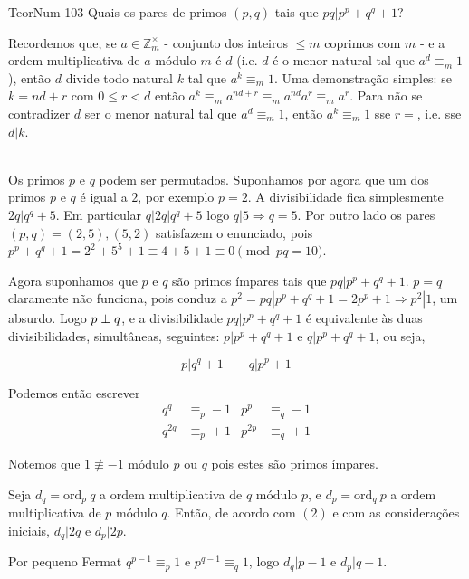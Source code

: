 \documentclass[repertorio-solutions-1.tex]{subfiles}
\renewcommand*{\ord}[1]{\ensuremath{\text{ord}_#1\:}}
\begin{document}
\begin{problem}{TeorNum 103}
Quais os pares de primos $(p,q)$ tais que $pq|p^p+q^q+1$?
\end{problem}

\begin{solution}
\begin{note}
Recordemos que, se $a\in\mathbb{Z}_m^\times$ - conjunto dos inteiros $\leq m$ coprimos com $m$ - e a ordem multiplicativa de $a$ módulo $m$ é $d$ (i.e. $d$ é o menor natural tal que $a^d\equiv_m 1$), então $d$ divide todo natural $k$ tal que $a^k\equiv_m 1$.
Uma demonstração simples: se $k=nd+r$ com $0\leq r<d$ então
$a^k\equiv_m a^{nd+r}\equiv_ma^{nd}a^r\equiv_ma^r$. Para não se contradizer $d$ ser o menor natural tal que $a^d\equiv_m 1$, então $a^k\equiv_m 1$ sse $r=$, i.e. sse $d|k$.
\end{note}
\\

Os primos $p$ e $q$ podem ser permutados. Suponhamos por agora que um dos primos $p$ e $q$ é igual a $2$, por exemplo $p=2$. A divisibilidade fica simplesmente $2q|q^q+5$. Em particular $q|2q|q^q+5$ logo $q|5\Rightarrow q=5$.
Por outro lado os pares $(p,q)=(2,5),(5,2)$ satisfazem o enunciado, pois
$p^p+q^q+1=2^2+5^5+1\equiv 4+5+1\equiv 0\pmod{pq=10}$.

Agora suponhamos que $p$ e $q$ são primos ímpares tais que $pq|p^p+q^q+1$.
$p=q$ claramente não funciona, pois conduz a $p^2=pq|p^p+q^q+1=2p^p+1\Rightarrow p^2|1$, um absurdo.
Logo $p\perp q$, e a divisibilidade $pq|p^p+q^q+1$ é equivalente às duas divisibilidades, simultâneas, seguintes:
$p|p^p+q^q+1$ e $q|p^p+q^q+1$, ou seja,

\begin{equation*}
p|q^q+1 \qquad q|p^p+1
\end{equation*}

Podemos então escrever
\begin{align}
q^q&\equiv_p -1 & p^p&\equiv_q -1\\
q^{2q}&\equiv_p +1 & p^{2p}&\equiv_q +1
\end{align}

Notemos que $1\not\equiv -1$ módulo $p$ ou $q$ pois estes são primos ímpares.

Seja $d_q=\ord{p} q$ a ordem multiplicativa de $q$ módulo $p$,
e $d_p=\ord{q} p$ a ordem multiplicativa de $p$ módulo $q$.
Então, de acordo com $(2)$ e com as considerações iniciais, $d_q|2q$ e $d_p|2p$.

Por pequeno Fermat $q^{p-1}\equiv_p 1$ e $p^{q-1}\equiv_q 1$,
logo $d_q|p-1$ e $d_p|q-1$.


\end{solution}
\end{document}
